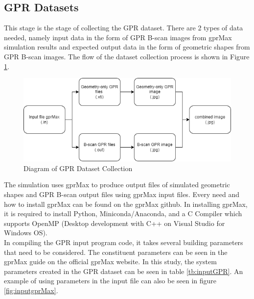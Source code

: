 \documentclass[conference]{IEEEtran}
\begin{document}
\subsection{GPR Datasets}\label{DatasetGPR}
This stage is the stage of collecting the GPR dataset. 
There are 2 types of data needed, namely input data in the form of GPR B-scan images from gprMax simulation results and expected output data in the form of geometric shapes from GPR B-scan images. 
The flow of the dataset collection process is shown in Figure \ref{fig:datasetgpr}.

\begin{figure}[ht]
  \centering
  \includegraphics[scale=0.35]{gambar/alur pengumpulan data EN.png}
  \caption{Diagram of GPR Dataset Collection}
  \label{fig:datasetgpr}
\end{figure}

The simulation uses gprMax to produce output files of simulated geometric shapes and GPR B-scan output files using gprMax input files. 
Every need and how to install gprMax can be found on the gprMax github. 
In installing gprMax, it is required to install Python, Miniconda/Anaconda, and a C Compiler which supports OpenMP (Desktop development with C++ on Visual Studio for Windows OS). \\

In compiling the GPR input program code, it takes several building parameters that need to be considered. 
The constituent parameters can be seen in the gprMax guide on the official gprMax website. 
In this study, the system parameters created in the GPR dataset can be seen in table \ref{tb:inputGPR}. 
An example of using parameters in the input file can also be seen in figure \ref{fig:inputgprMax}.
\end{document}
